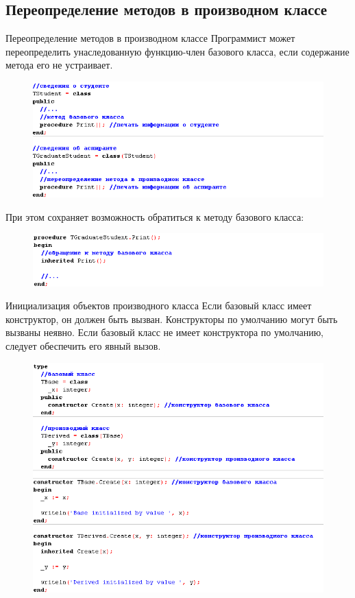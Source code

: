 \documentclass{beamer}
\begin{document}
\subsection{Переопределение методов в производном классе}
\begin{frame}{Переопределение методов в производном классе}
Программист может переопределить унаследованную функцию-член базового класса, если содержание метода его не устраивает.
\begin{figure}[h]
\centering
\includegraphics[scale=0.5]{images/lec06-pic23.png}
\end{figure}
При этом сохраняет возможность обратиться к методу базового класса:
\begin{figure}[h]
\centering
\includegraphics[scale=0.5]{images/lec06-pic24.png}
\end{figure}
\end{frame}

\begin{frame}{Инициализация объектов производного класса}
Если базовый класс имеет конструктор, он должен быть вызван. Конструкторы по умолчанию могут быть вызваны неявно. Если базовый класс не имеет
конструктора по умолчанию, следует обеспечить его явный вызов.
\begin{figure}[h]
\centering
\includegraphics[scale=0.4]{images/lec06-pic25.png}
\end{figure}
\end{frame}
\end{document}

